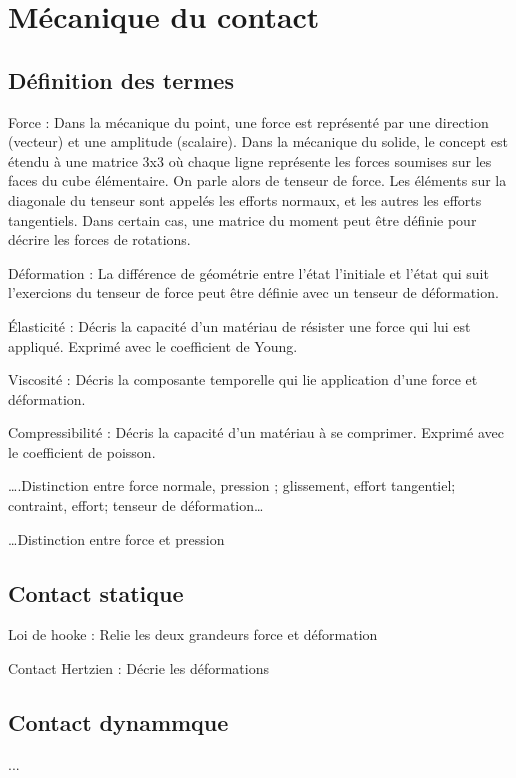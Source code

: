 \section{Mécanique du contact}

\subsection{Définition des termes}
Force : Dans la mécanique du point, une force est représenté par une direction (vecteur) et une amplitude (scalaire). Dans la mécanique du solide, le concept est étendu à une matrice 3x3 où chaque ligne représente les forces soumises sur les faces du cube élémentaire. On parle alors de tenseur de force. Les éléments sur la diagonale du tenseur sont appelés les efforts normaux, et les autres les efforts tangentiels. Dans certain cas, une matrice du moment peut être définie pour décrire les forces de rotations.\par
Déformation : La différence de géométrie entre l’état l’initiale et l’état qui suit l’exercions  du tenseur de force peut être définie avec un tenseur de déformation.\par
Élasticité : Décris la capacité d’un matériau de résister une force qui lui est appliqué. Exprimé avec le coefficient de Young.\par
Viscosité : Décris la composante temporelle qui lie application d’une force et déformation.\par
Compressibilité : Décris la capacité d’un matériau à se comprimer. Exprimé avec le coefficient de poisson.\par

….Distinction entre force normale, pression ; glissement, effort tangentiel; contraint, effort; tenseur de déformation…\par
…Distinction entre force et pression\par

\subsection{Contact statique}
Loi de hooke : Relie les deux grandeurs force et déformation\par
Contact Hertzien : Décrie les déformations\par

\subsection{Contact dynammque}
...

